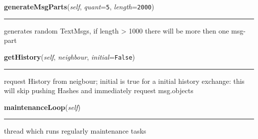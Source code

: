     \vspace{0.5ex}

\hspace{.8\funcindent}\begin{boxedminipage}{\funcwidth}

    \raggedright \textbf{generateMsgParts}(\textit{self}, \textit{quant}={\tt 5}, \textit{length}={\tt 2000})

    \vspace{-1.5ex}

    \rule{\textwidth}{0.5\fboxrule}
\setlength{\parskip}{2ex}
    generates random TextMsgs, if length {\textgreater} 1000 there will be 
    more then one msg-part

\setlength{\parskip}{1ex}
    \end{boxedminipage}

    \label{peer:Peer:getHistory}

    \vspace{0.5ex}

\hspace{.8\funcindent}\begin{boxedminipage}{\funcwidth}

    \raggedright \textbf{getHistory}(\textit{self}, \textit{neighbour}, \textit{initial}={\tt False})

    \vspace{-1.5ex}

    \rule{\textwidth}{0.5\fboxrule}
\setlength{\parskip}{2ex}
    request History from neigbour; initial is true for a initial history 
    exchange: this will skip pushing Hashes and immediately request 
    msg.objects

\setlength{\parskip}{1ex}
    \end{boxedminipage}

    \label{peer:Peer:maintenanceLoop}

    \vspace{0.5ex}

\hspace{.8\funcindent}\begin{boxedminipage}{\funcwidth}

    \raggedright \textbf{maintenanceLoop}(\textit{self})

    \vspace{-1.5ex}

    \rule{\textwidth}{0.5\fboxrule}
\setlength{\parskip}{2ex}
    thread which runs regularly maintenance tasks

\setlength{\parskip}{1ex}
    \end{boxedminipage}

